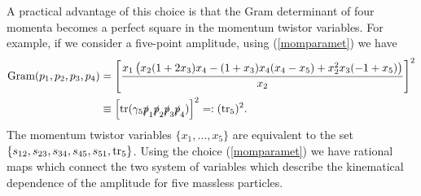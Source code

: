 A practical advantage of this choice is that the Gram determinant of four momenta becomes a perfect square in the momentum twistor variables. For example, if we consider a five-point amplitude, using (\ref{momparamet}) we have
\begin{align*}
	\text{Gram}(p_1,p_2,p_3, p_4)&=\left[\frac{x_1\left(x_2(1+2 x_3)x_4-(1+x_3)x_4(x_4-x_5)+x_2^2x_3(-1+x_5)\right)}{x_2}\right]^2\\
	&\equiv\left[\text{tr}(\gamma_5 \slashed p_1 \slashed p_2 \slashed p_3 \slashed p_4)\right]^2=: (\text{tr}_5)^2.
\end{align*}
The momentum twistor variables $\{x_1,\dots,x_5\}$ are equivalent to the set $\{s_{12},s_{23},s_{34},s_{45},s_{51},\tr_5\}$. Using the choice (\ref{momparamet}) we have rational maps which connect the two system of variables which describe the kinematical dependence of the amplitude for five massless particles.

